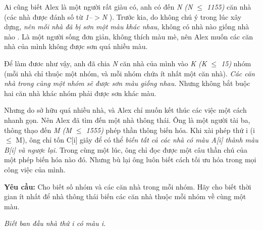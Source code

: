 Ai cũng biết Alex là một người rất giàu có, anh có đến   \emph{    N (N $\le$ 1155)   }   căn nhà (các nhà được đánh số từ   \emph{    1--$>$N   }   ). Trước kia, do không chú ý trong lúc xây dựng,   \emph{    nên mỗi nhà đã bị sơn một màu khác nhau,   }   không có nhà nào giống nhà nào . Là một người sống đơn giản, không thích màu mè, nên Alex muốn các căn nhà của mình không được sơn quá nhiều màu.  

   Để làm đươc như vậy, anh đã chia   \emph{    N   }   căn nhà của mình vào   \textbf{\emph{}}\emph{    K (K $\le$ 15)   }   nhóm (mỗi nhà chỉ thuộc một nhóm, và mỗi nhóm chứa ít nhất một căn nhà).   \emph{    Các căn nhà trong cùng một nhóm sẽ được sơn màu giống nhau.   }   Nhưng không bắt buộc hai căn nhà khác nhóm phải được sơn khác màu.   \emph{
\\}

   Nhưng do sở hữu quá nhiều nhà, và Alex chỉ muốn kết thúc các việc một cách nhanh gọn. Nên Alex đã tìm đến một nhà thông thái. Ông là một người tài ba, thông thạo đến   \emph{    M (M $\le$ 1555)   }   phép thần thông biến hóa. Khi xài phép thứ i (i $\le$ M), ông chỉ tốn C[i] giây để có thể   \emph{    biến tất cả các nhà có màu A[i] thành màu B[i] và ngược lại.   }   Trong cùng một lúc, ông chỉ đọc được một câu thần chú của một phép biến hóa nào đó.   \emph{}   Nhưng bù lại ông luôn biết cách tối ưu hóa trong mọi công việc của mình.   \emph{
\\}

\textbf{    Yêu cầu:   }   Cho biết số nhóm và các căn nhà trong mỗi nhóm. Hãy cho biết thời gian ít nhất để nhà thông thái biến các căn nhà thuộc mỗi nhóm về cùng một màu.  

\emph{    Biết ban đầu nhà thứ i có màu i.    
\\}

\